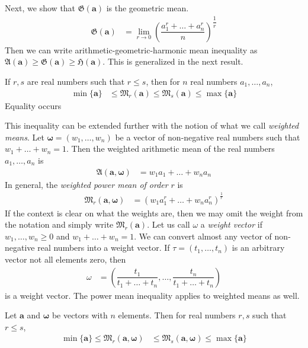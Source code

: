 \documentclass{subfile}
\begin{document}
	Next, we show that $\mathfrak{G}(\mathbf{a})$ is the geometric mean.
		\begin{align*}
			\mathfrak{G}(\mathbf{a})
				& = \lim\limits_{r\to0}\left(\dfrac{a_1^r+\ldots+a_n^r}{n}\right)^{\dfrac{1}{r}}
		\end{align*}
	Then we can write arithmetic-geometric-harmonic mean inequality as $\mathfrak{A}(\mathbf{a})\geq\mathfrak{G}(\mathbf{a})\geq \mathfrak{H}(\mathbf{a})$. This is generalized in the next result.
		\begin{theorem}
			If $r,s$ are real numbers such that $r\leq s$, then for $n$ real numbers $a_1,\ldots,a_n$,
				\begin{align*}
					\min\{\mathbf{a}\}
						& \leq \mathfrak{M}_r(\mathbf{a})\leq \mathfrak{M}_s(\mathbf{a})\leq\max\{\mathbf{a}\}
				\end{align*}
			Equality occurs 
		\end{theorem}
	This inequality can be extended further with the notion of what we call \textit{weighted means}. Let $\mathbf{\omega}=(w_{1},\ldots,w_{n})$ be a vector of non-negative real numbers such that $w_{1}+\ldots+w_{n}=1$. Then the weighted arithmetic mean of the real numbers $a_{1},\ldots,a_{n}$ is
		\begin{align*}
			\mathfrak{A}(\mathbf{a},\mathbf{\omega})
				& = w_{1}a_{1}+\ldots+w_{n}a_{n}
		\end{align*}
	In general, the \textit{weighted power mean of order} $r$ is
		\begin{align*}
			\mathfrak{M}_{r}(\mathbf{a},\mathbf{\omega})
				& = \left(w_{1}a_{1}^{r}+\ldots+w_{n}a_{n}^{r}\right)^{\frac{1}{r}}
		\end{align*}
	If the context is clear on what the weights are, then we may omit the weight from the notation and simply write $\mathfrak{M}_{r}(\mathbf{a})$. Let us call $\omega$ a \textit{weight vector} if $w_{1},\ldots,w_{n}\geq 0$ and $w_{1}+\ldots+w_{n}=1$. We can convert almost any vector of non-negative real numbers into a weight vector. If $\tau=(t_{1},\ldots,t_{n})$ is an arbitrary vector not all elements zero, then
		\begin{align*}
			\omega
				& = \left(\dfrac{t_{1}}{t_{1}+\ldots+t_{n}},\ldots,\dfrac{t_{n}}{t_{1}+\ldots+t_{n}}\right)
		\end{align*}
	is a weight vector. The power mean inequality applies to weighted means as well.
		\begin{theorem}\label{thm:weightedpowermean}
			Let $\mathbf{a}$ and $\mathbf{\omega}$ be vectors with $n$ elements. Then for real numbers $r,s$ such that $r\leq s$,
				\begin{align*}
					\min\{\mathbf{a}\} \leq \mathfrak{M}_{r}(\mathbf{a},\mathbf{\omega})
						& \leq \mathfrak{M}_{s}(\mathbf{a},\mathbf{\omega})\leq \max\{\mathbf{a}\}
				\end{align*}
		\end{theorem}
\end{document}
